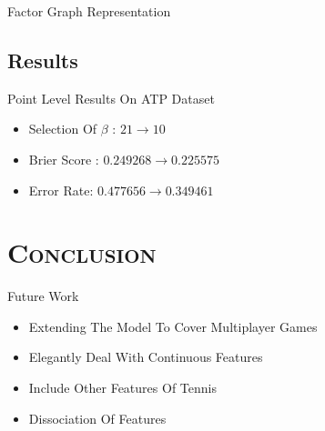 \documentclass[xcolor=x11names,compress]{beamer}
\newcommand\given[1][]{\:#1\vert\:}
\renewcommand{\(}{\begin{columns}}
\renewcommand{\)}{\end{columns}}
\newcommand{\<}[1]{\begin{column}{#1}}
\renewcommand{\>}{\end{column}}
\begin{document}
\begin{frame}{Factor Graph Representation}
\begin{adjustbox}{max totalsize={1\textwidth}{.9\textheight},center}
\end{adjustbox}
\end{frame}



\subsection{Results}
\begin{frame}{Point Level Results On ATP Dataset}

\begin{itemize}[<+->]
	\item Selection Of $\beta$ : $21 \rightarrow 10$
	\item Brier Score : $0.249268 \rightarrow 0.225575$
	\item Error Rate: $0.477656 \rightarrow 0.349461$ 			
\end{itemize}



\end{frame}


\section{\scshape Conclusion}
\begin{frame}{Future Work}

\begin{itemize}[<+->]
	\item Extending The Model To Cover Multiplayer Games
	\item Elegantly Deal With Continuous Features
	\item Include Other Features Of Tennis
	\item Dissociation Of Features
\end{itemize}
\end{frame}
\end{document}
